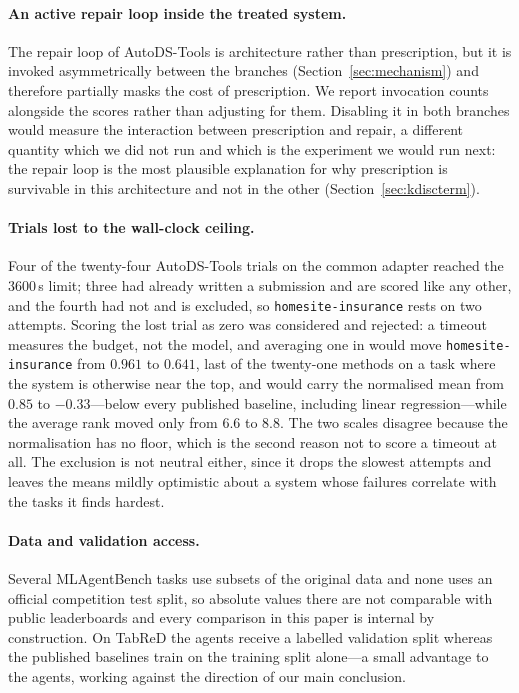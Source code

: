\paragraph{An active repair loop inside the treated system.} The repair loop of
AutoDS-Tools is architecture rather than prescription, but it is invoked
asymmetrically between the branches (Section~\ref{sec:mechanism}) and therefore
partially masks the cost of prescription. We report invocation counts alongside
the scores rather than adjusting for them. Disabling it in both branches would
measure the interaction between prescription and repair, a different quantity
which we did not run and which is the experiment we would run next: the repair
loop is the most plausible explanation for why prescription is survivable in this
architecture and not in the other (Section~\ref{sec:kdiscterm}).

\begin{sloppypar}
\paragraph{Trials lost to the wall-clock ceiling.} Four of the twenty-four
AutoDS-Tools trials on the common adapter reached the $3600$\,s limit; three had
already written a submission and are scored like any other, and the fourth had
not and is excluded, so \texttt{homesite-insurance} rests on two attempts.
Scoring the lost trial as zero was considered and rejected: a timeout measures
the budget, not the model, and averaging one in would move
\texttt{homesite-insurance} from $0.961$ to $0.641$, last of the twenty-one
methods on a task where the system is otherwise near the top, and would carry
the normalised mean from $0.85$ to $-0.33$---below every published baseline,
including linear regression---while the average rank moved only from $6.6$ to
$8.8$. The two scales disagree because the normalisation has no floor, which is
the second reason not to score a timeout at all. The exclusion is not neutral either, since it drops the
slowest attempts and leaves the means mildly optimistic about a system whose
failures correlate with the tasks it finds hardest.
\end{sloppypar}

\paragraph{Data and validation access.} Several MLAgentBench tasks use subsets of
the original data and none uses an official competition test split, so absolute
values there are not comparable with public leaderboards and every comparison in
this paper is internal by construction. On TabReD the agents receive a labelled
validation split whereas the published baselines train on the training split
alone---a small advantage to the agents, working against the direction of our
main conclusion.

